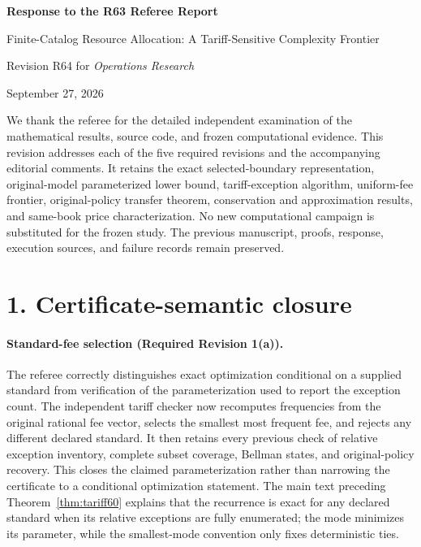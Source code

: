 \documentclass[11pt,letterpaper]{article}
\theoremstyle{definition}\newtheorem{remark}[theorem]{Remark}
\begin{document}
\begin{center}{\Large\bfseries Response to the R63 Referee Report}\par\medskip
Finite-Catalog Resource Allocation: A Tariff-Sensitive Complexity Frontier\par
Revision R64 for \emph{Operations Research}\par September 27, 2026\end{center}

We thank the referee for the detailed independent examination of the mathematical results, source code, and frozen computational evidence. This revision addresses each of the five required revisions and the accompanying editorial comments. It retains the exact selected-boundary representation, original-model parameterized lower bound, tariff-exception algorithm, uniform-fee frontier, original-policy transfer theorem, conservation and approximation results, and same-book price characterization. No new computational campaign is substituted for the frozen study. The previous manuscript, proofs, response, execution sources, and failure records remain preserved.

\section*{1. Certificate-semantic closure}
\paragraph{Standard-fee selection (Required Revision 1(a)).}
The referee correctly distinguishes exact optimization conditional on a supplied standard from verification of the parameterization used to report the exception count. The independent tariff checker now recomputes frequencies from the original rational fee vector, selects the smallest most frequent fee, and rejects any different declared standard. It then retains every previous check of relative exception inventory, complete subset coverage, Bellman states, and original-policy recovery. This closes the claimed parameterization rather than narrowing the certificate to a conditional optimization statement. The main text preceding Theorem~\ref{thm:tariff60} explains that the recurrence is exact for any declared standard when its relative exceptions are fully enumerated; the mode minimizes its parameter, while the smallest-mode convention only fixes deterministic ties.
\end{document}
